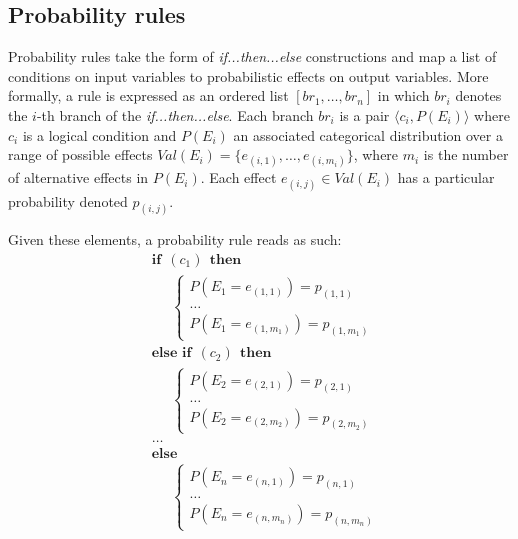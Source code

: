 \subsection{Probability rules}
\label{sec:probabirules}

Probability rules take the form of \textit{if...then...else} constructions and map a list of conditions on input variables to probabilistic effects on output variables. More formally, a rule is expressed as an ordered list $[ br_1, \dots, br_{n}]$ in which $br_i$ denotes the $i$-th branch of the \textit{if...then...else}. Each branch $br_i$ is a pair $\langle c_i, P(E_i) \rangle$ where $c_i$ is a logical condition and $P(E_i)$ an associated categorical distribution over a range of possible effects $\mathit{Val}(E_i) = \{e_{(i,1)}, \dots, e_{(i,m_i)}\}$, where $m_i$ is the number of alternative effects in $P(E_i)$.  Each effect $e_{(i,j)} \in \mathit{Val}(E_i)$ has a particular probability denoted $p_{(i,j)}$. 

Given these elements, a probability rule reads as such:
\begin{equation}
\begin{aligned}
& \textbf{if} \ \ (c_{1}) \ \ \textbf{then} \\ 
& \;\;\;\;\; \begin{cases}
P(E_1\!=\!e_{(1,1)}) = p_{(1,1)} \\
 \dots \\
P(E_1\!=\!e_{(1,m_1)}) = p_{(1,m_1)} 
\end{cases} \\[3mm]
& \textbf{else if} \ \ (c_{2}) \ \ \textbf{then} \\ 
& \;\;\;\;\; \begin{cases}
P(E_2\!=\!e_{(2,1)}) = p_{(2,1)} \\
 \dots \\
P(E_2\!=\!e_{(2,m_2)}) = p_{(2,m_2)}
\end{cases} \\ 
& \dots  \\
& \textbf{else} \\
& \;\;\;\;\; \begin{cases}
P(E_{n}\!=\!e_{(n,1)}) = p_{(n,1)} \\
\dots \\
P(E_{n}\!=\!e_{(n,m_n)}) = p_{(n,m_n)}
\end{cases}
\end{aligned}
\label{eq:probrule}
\end{equation}

